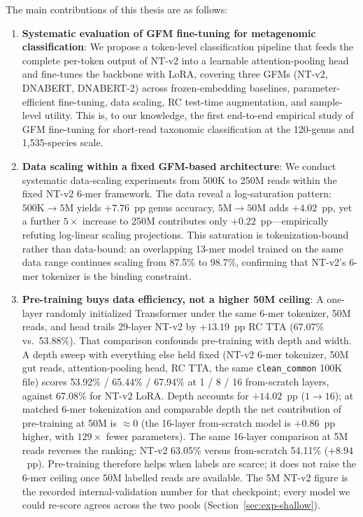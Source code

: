 The main contributions of this thesis are as follows:

\begin{enumerate}
    \item \textbf{Systematic evaluation of GFM fine-tuning for metagenomic classification}: We propose a token-level classification pipeline that feeds the complete per-token output of NT-v2 into a learnable attention-pooling head and fine-tunes the backbone with LoRA, covering three GFMs (NT-v2, DNABERT, DNABERT-2) across frozen-embedding baselines, parameter-efficient fine-tuning, data scaling, RC test-time augmentation, and sample-level utility. This is, to our knowledge, the first end-to-end empirical study of GFM fine-tuning for short-read taxonomic classification at the 120-genus and 1,535-species scale.

    \item \textbf{Data scaling within a fixed GFM-based architecture}: We conduct systematic data-scaling experiments from 500K to 250M reads within the fixed NT-v2 6-mer framework. The data reveal a log-saturation pattern: $500\text{K}\to 5\text{M}$ yields $+7.76$~pp genus accuracy, $5\text{M}\to 50\text{M}$ adds $+4.02$~pp, yet a further $5\times$ increase to 250M contributes only $+0.22$~pp---empirically refuting log-linear scaling projections. This saturation is tokenization-bound rather than data-bound: an overlapping 13-mer model trained on the same data range continues scaling from 87.5\% to 98.7\%, confirming that NT-v2's 6-mer tokenizer is the binding constraint.

    \item \textbf{Pre-training buys data efficiency, not a higher 50M ceiling}: A one-layer randomly initialized Transformer under the same 6-mer tokenizer, 50M reads, and head trails 29-layer NT-v2 by $+13.19$~pp RC TTA (67.07\% vs.\ 53.88\%). That comparison confounds pre-training with depth and width. A depth sweep with everything else held fixed (NT-v2 6-mer tokenizer, 50M gut reads, attention-pooling head, RC TTA, the same \texttt{clean\_common} 100K file) scores 53.92\% / 65.44\% / 67.94\% at 1 / 8 / 16 from-scratch layers, against 67.08\% for NT-v2 LoRA. Depth accounts for $+14.02$~pp ($1\to 16$); at matched 6-mer tokenization and comparable depth the net contribution of pre-training at 50M is $\approx 0$ (the 16-layer from-scratch model is $+0.86$~pp higher, with $129\times$ fewer parameters). The same 16-layer comparison at 5M reads reverses the ranking: NT-v2 63.05\% versus from-scratch 54.11\% ($+8.94$~pp). Pre-training therefore helps when labels are scarce; it does not raise the 6-mer ceiling once 50M labelled reads are available. The 5M NT-v2 figure is the recorded internal-validation number for that checkpoint; every model we could re-score agrees across the two pools (Section~\ref{sec:exp-shallow}).


\end{enumerate}
